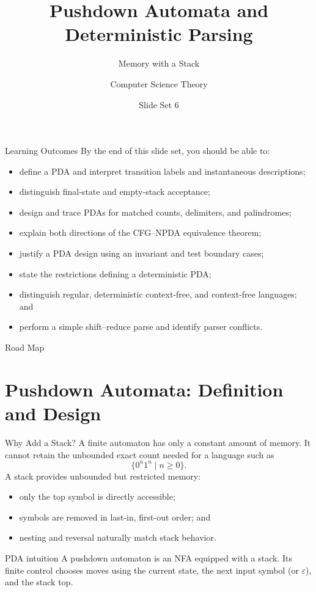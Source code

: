 \documentclass[10pt]{beamer}
\title{Pushdown Automata and Deterministic Parsing}
\subtitle{Memory with a Stack}
\author{Computer Science Theory}
\date{Slide Set 6}
\begin{document}
\begin{frame}
  \titlepage
\end{frame}

\begin{frame}{Learning Outcomes}
  \small
  By the end of this slide set, you should be able to:
  \begin{itemize}
    \item define a PDA and interpret transition labels and instantaneous descriptions;
    \item distinguish final-state and empty-stack acceptance;
    \item design and trace PDAs for matched counts, delimiters, and palindromes;
    \item explain both directions of the CFG--NPDA equivalence theorem;
    \item justify a PDA design using an invariant and test boundary cases;
    \item state the restrictions defining a deterministic PDA;
    \item distinguish regular, deterministic context-free, and context-free languages; and
    \item perform a simple shift--reduce parse and identify parser conflicts.
  \end{itemize}
\end{frame}

\begin{frame}{Road Map}
  \tableofcontents
\end{frame}

\section{Pushdown Automata: Definition and Design}

\begin{frame}{Why Add a Stack?}
  A finite automaton has only a constant amount of memory. It cannot retain the unbounded exact count
  needed for a language such as
  \[
    \{0^n1^n\mid n\ge0\}.
  \]
  \pause
  A stack provides unbounded but restricted memory:
  \begin{itemize}
    \item only the top symbol is directly accessible;
    \item symbols are removed in last-in, first-out order; and
    \item nesting and reversal naturally match stack behavior.
  \end{itemize}
  \pause
  \begin{block}{PDA intuition}
    A pushdown automaton is an NFA equipped with a stack. Its finite control chooses moves using the
    current state, the next input symbol (or $\varepsilon$), and the stack top.
  \end{block}
\end{frame}
\end{document}
